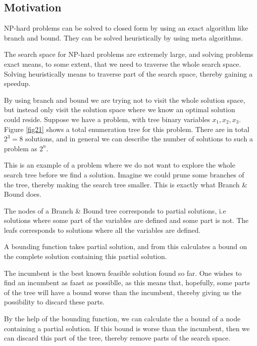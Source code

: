 \documentclass[10pt]{article}
\begin{document}
\subsection{Motivation} %
\label{sub:motivation}
NP-hard problems can be solved to closed form by using an exact algorithm like branch and bound. They can be solved heuristically by using meta algorithms.

The search space for NP-hard problems are extremely large, and solving problems exact means, to some extent, that we need to traverse the whole search space. Solving heuristically means to traverse part of the search space, thereby gaining a speedup. 

By using branch and bound we are trying not to visit the whole solution space, but instead only visit the solution space where we know an optimal solution could reside. Suppose we have a problem, with tree binary variables $x_1, x_2, x_3$. Figure \ref{fig21} shows a total enumeration tree for this problem. There are in total $2^3 = 8$ solutions, and in general we can describe the number of solutions to such a problem as $2^n$.

This is an example of a problem where we do not want to explore the whole search tree before we find a solution. Imagine we could prune some branches of the tree, thereby making the search tree smaller. This is exactly what Branch \& Bound does.

The nodes of a Branch \& Bound tree corresponds to partial solutions, i.e solutions where some part of the variables are defined and some part is not. The leafs corresponds to solutions where all the variables are defined.

A bounding function takes partial solution, and from this calculates a bound on the complete solution containing this partial solution.

The incumbent is the best known feasible solution found so far. One wishes to find an incumbent as faast as possiblle, as this means that, hopefully, some parts of the tree will have a bound worse than the incumbent, thereby giving us the possibility to discard these parts.

By the help of the bounding function, we can calculate the a bound of a node containing a partial solution. If this bound is worse than the incumbent, then we can discard this part of the tree, thereby remove parts of the search space.
\end{document}
